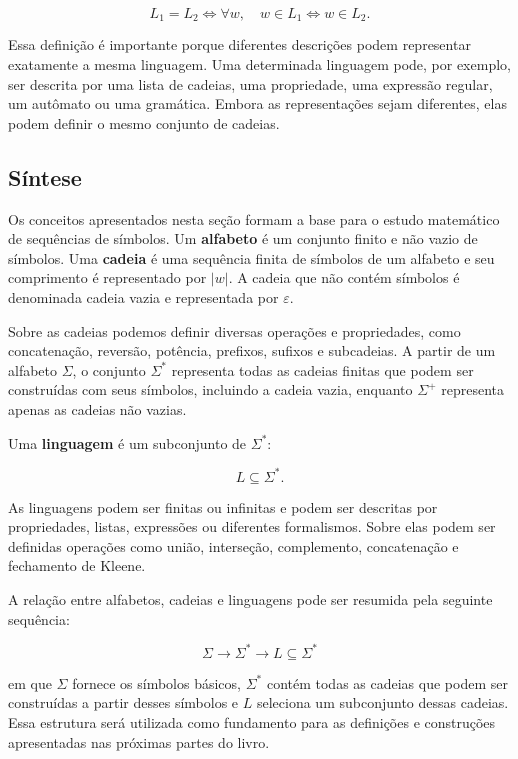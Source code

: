 \documentclass[
  brazilian,
  letterpaper,
]{book}
\theoremstyle{plain}
\theoremstyle{definition}
\theoremstyle{remark}
\begin{document}
\[
L_1=L_2
\iff
\forall w,\quad
w\in L_1\Longleftrightarrow w\in L_2.
\]

Essa definição é importante porque diferentes descrições podem
representar exatamente a mesma linguagem. Uma determinada linguagem
pode, por exemplo, ser descrita por uma lista de cadeias, uma
propriedade, uma expressão regular, um autômato ou uma gramática. Embora
as representações sejam diferentes, elas podem definir o mesmo conjunto
de cadeias.

\subsection{Síntese}\label{suxedntese-2}

Os conceitos apresentados nesta seção formam a base para o estudo
matemático de sequências de símbolos. Um \textbf{alfabeto} é um conjunto
finito e não vazio de símbolos. Uma \textbf{cadeia} é uma sequência
finita de símbolos de um alfabeto e seu comprimento é representado por
\(|w|\). A cadeia que não contém símbolos é denominada cadeia vazia e
representada por \(\varepsilon\).

Sobre as cadeias podemos definir diversas operações e propriedades, como
concatenação, reversão, potência, prefixos, sufixos e subcadeias. A
partir de um alfabeto \(\Sigma\), o conjunto \(\Sigma^*\) representa
todas as cadeias finitas que podem ser construídas com seus símbolos,
incluindo a cadeia vazia, enquanto \(\Sigma^+\) representa apenas as
cadeias não vazias.

Uma \textbf{linguagem} é um subconjunto de \(\Sigma^*\):

\[
\boxed{L\subseteq\Sigma^*}.
\]

As linguagens podem ser finitas ou infinitas e podem ser descritas por
propriedades, listas, expressões ou diferentes formalismos. Sobre elas
podem ser definidas operações como união, interseção, complemento,
concatenação e fechamento de Kleene.

A relação entre alfabetos, cadeias e linguagens pode ser resumida pela
seguinte sequência:

\[
\boxed{
\Sigma
\longrightarrow
\Sigma^*
\longrightarrow
L\subseteq\Sigma^*
}
\]

em que \(\Sigma\) fornece os símbolos básicos, \(\Sigma^*\) contém todas
as cadeias que podem ser construídas a partir desses símbolos e \(L\)
seleciona um subconjunto dessas cadeias. Essa estrutura será utilizada
como fundamento para as definições e construções apresentadas nas
próximas partes do livro.
\end{document}
